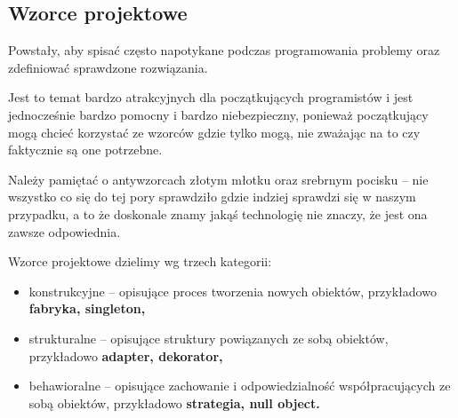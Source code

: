 \subsection{Wzorce projektowe}
Powstały, aby spisać często napotykane podczas programowania problemy oraz zdefiniować sprawdzone rozwiązania.

Jest to temat bardzo atrakcyjnych dla początkujących programistów i jest jednocześnie bardzo pomocny i bardzo niebezpieczny, ponieważ początkujący mogą chcieć korzystać ze wzorców gdzie tylko mogą, nie zważając na to czy faktycznie są one potrzebne.

Należy pamiętać o antywzorcach złotym młotku oraz srebrnym pocisku -- nie wszystko co się do tej pory sprawdziło gdzie indziej sprawdzi się w naszym przypadku, a to że doskonale znamy jakąś technologię nie znaczy, że jest ona zawsze odpowiednia.

Wzorce projektowe dzielimy wg trzech kategorii:
\begin{itemize}
	\item{konstrukcyjne -- opisujące proces tworzenia nowych obiektów, przykładowo \textbf{fabryka, singleton,}}
	\item{strukturalne -- opisujące struktury powiązanych ze sobą obiektów, przykładowo \textbf{adapter, dekorator,}}
	\item{behawioralne -- opisujące zachowanie i odpowiedzialność współpracujących ze sobą obiektów, przykładowo \textbf{strategia, null object.}}
\end{itemize}
